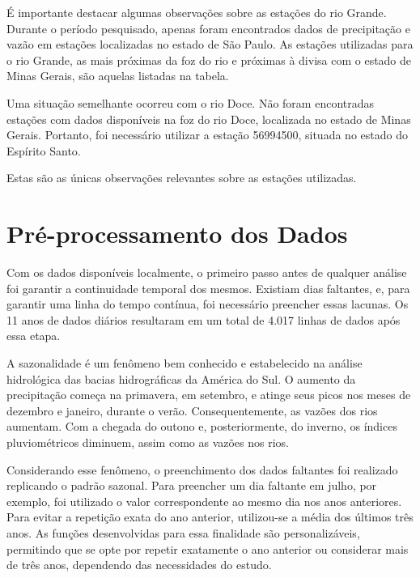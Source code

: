 É importante destacar algumas observações sobre as estações do rio Grande. Durante o período pesquisado, apenas foram encontrados dados de precipitação e vazão em estações localizadas no estado de São Paulo. As estações utilizadas para o rio Grande, as mais próximas da foz do rio e próximas à divisa com o estado de Minas Gerais, são aquelas listadas na tabela.

Uma situação semelhante ocorreu com o rio Doce. Não foram encontradas estações com dados disponíveis na foz do rio Doce, localizada no estado de Minas Gerais. Portanto, foi necessário utilizar a estação 56994500, situada no estado do Espírito Santo.

Estas são as únicas observações relevantes sobre as estações utilizadas.

\section{Pré-processamento dos Dados}

Com os dados disponíveis localmente, o primeiro passo antes de qualquer análise foi garantir a continuidade temporal dos mesmos. Existiam dias faltantes, e, para garantir uma linha do tempo contínua, foi necessário preencher essas lacunas. Os 11 anos de dados diários resultaram em um total de 4.017 linhas de dados após essa etapa.

A sazonalidade é um fenômeno bem conhecido e estabelecido na análise hidrológica das bacias hidrográficas da América do Sul. O aumento da precipitação começa na primavera, em setembro, e atinge seus picos nos meses de dezembro e janeiro, durante o verão. Consequentemente, as vazões dos rios aumentam. Com a chegada do outono e, posteriormente, do inverno, os índices pluviométricos diminuem, assim como as vazões nos rios. \cite{rayyan-39677094}

Considerando esse fenômeno, o preenchimento dos dados faltantes foi realizado replicando o padrão sazonal. Para preencher um dia faltante em julho, por exemplo, foi utilizado o valor correspondente ao mesmo dia nos anos anteriores. Para evitar a repetição exata do ano anterior, utilizou-se a média dos últimos três anos. As funções desenvolvidas para essa finalidade são personalizáveis, permitindo que se opte por repetir exatamente o ano anterior ou considerar mais de três anos, dependendo das necessidades do estudo.

